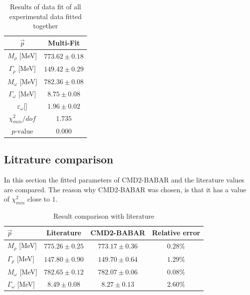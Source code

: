 \documentclass[a4paper]{article}
\begin{document}
\begin{table}[H]
    \caption{Results of data fit of all experimental data fitted together\label{tabmulti}}
    \centering
    \begin{tabular}{|c|c|}
        \hline
        $\vec{p}$   & Multi-Fit\\
        \hline
        $M_{\rho}$       [MeV]       & $773.62	\pm 0.18$   \\
        $\Gamma_{\rho}$     [MeV]    & $149.42	\pm 0.29$  \\
        $M_{\omega}$         [MeV]   & $782.36	\pm 0.08$  \\
        $\Gamma_{\omega}$   [MeV]    & $8.75	\pm 0.08    $  \\
        $\varepsilon_{\omega}$[]  & $1.96	\pm 0.02    $  \\
        \hline \hline
        $\chi^2_{min}/dof$      & $1.735$\\
        $p\text{-value}$        & $0.000$\\
        \hline

    \end{tabular}
\end{table}

\subsection{Litrature comparison}
In this section the fitted parameters of CMD2-BABAR and the literature values\cite{particleref} are compared.
The reason why CMD2-BABAR was chosen, is that it has a value of $\chi^2_{min}$ close to $1$.

\begin{table}[H]
    \caption{Result comparison with literature\label{tabref}}
    \centering
    \begin{tabular}{|l|c|c|c|}
        \hline
        $\vec{p}$     & Literature    &   CMD2-BABAR      & Relative error \\
        \hline
        $M_{\rho}$   [MeV]           & $775.26	\pm 0.25$ & $773.17	\pm 0.36$ & $ 0.28 \%$\\
        $\Gamma_{\rho}$   [MeV]      & $147.80	\pm 0.90$  & $149.70	\pm 0.64$  & $ 1.29 \%$ \\
        $M_{\omega}$       [MeV]     & $782.65	\pm 0.12$  & $782.07	\pm 0.06$ & $ 0.08\% $ \\
        $\Gamma_{\omega}$  [MeV]     & $8.49	\pm 0.08    $ & $8.27	\pm 0.13$  & $ 2.60 \%$\\
        \hline
    \end{tabular}
\end{table}
\end{document}
